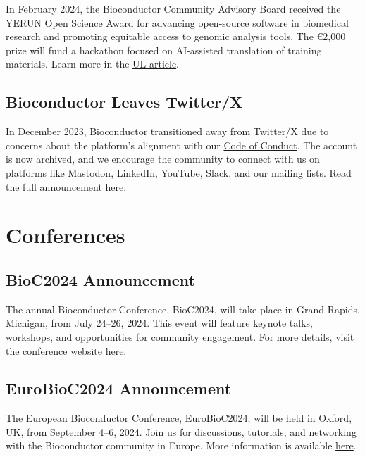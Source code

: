 In February 2024, the Bioconductor Community Advisory Board received the YERUN Open Science Award for advancing open-source software in biomedical research and promoting equitable access to genomic analysis tools. The €2,000 prize will fund a hackathon focused on AI-assisted translation of training materials. Learn more in the \href{https://www.ul.ie/research/news/university-of-limerick-researchers-win-european-award-for-commitment-to-open-science}{UL article}.

\subsection{Bioconductor Leaves Twitter/X}\label{bioconductor-leaves-twitterx}

In December 2023, Bioconductor transitioned away from Twitter/X due to concerns about the platform's alignment with our \href{https://bioconductor.org/about/code-of-conduct/}{Code of Conduct}. The account is now archived, and we encourage the community to connect with us on platforms like Mastodon, LinkedIn, YouTube, Slack, and our mailing lists. Read the full announcement \href{https://blog.bioconductor.org/posts/2023-11-17-twitter-exit/}{here}.

\section{Conferences}\label{conferences}

\subsection{BioC2024 Announcement}\label{bioc2024-announcement}

The annual Bioconductor Conference, BioC2024, will take place in Grand Rapids, Michigan, from July 24--26, 2024. This event will feature keynote talks, workshops, and opportunities for community engagement. For more details, visit the conference website \href{https://www.bioc2024.bioconductor.org/}{here}.

\subsection{EuroBioC2024 Announcement}\label{eurobioc2024-announcement}

The European Bioconductor Conference, EuroBioC2024, will be held in Oxford, UK, from September 4--6, 2024. Join us for discussions, tutorials, and networking with the Bioconductor community in Europe. More information is available \href{https://eurobioc2024.bioconductor.org/}{here}.

